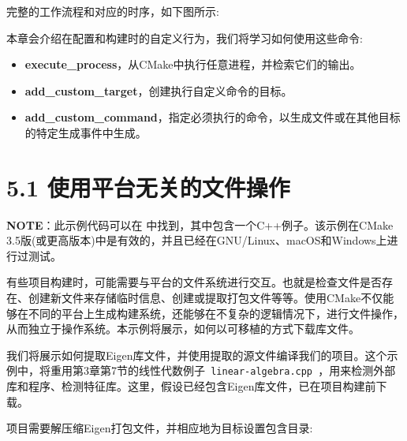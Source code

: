 完整的工作流程和对应的时序，如下图所示:


本章会介绍在配置和构建时的自定义行为，我们将学习如何使用这些命令:

\begin{itemize}
\item \textbf{execute\_process}，从CMake中执行任意进程，并检索它们的输出。

\item \textbf{add\_custom\_target}，创建执行自定义命令的目标。

\item \textbf{add\_custom\_command}，指定必须执行的命令，以生成文件或在其他目标的特定生成事件中生成。

\end{itemize}


\section{5.1 使用平台无关的文件操作}

\begin{myInfoBox}
\textbf{NOTE}：此示例代码可以在  中找到，其中包含一个C++例子。该示例在CMake 3.5版(或更高版本)中是有效的，并且已经在GNU/Linux、macOS和Windows上进行过测试。
\end{myInfoBox}

有些项目构建时，可能需要与平台的文件系统进行交互。也就是检查文件是否存在、创建新文件来存储临时信息、创建或提取打包文件等等。使用CMake不仅能够在不同的平台上生成构建系统，还能够在不复杂的逻辑情况下，进行文件操作，从而独立于操作系统。本示例将展示，如何以可移植的方式下载库文件。


我们将展示如何提取Eigen库文件，并使用提取的源文件编译我们的项目。这个示例中，将重用第3章第7节的线性代数例子\texttt{ linear-algebra.cpp }，用来检测外部库和程序、检测特征库。这里，假设已经包含Eigen库文件，已在项目构建前下载。


项目需要解压缩Eigen打包文件，并相应地为目标设置包含目录:

